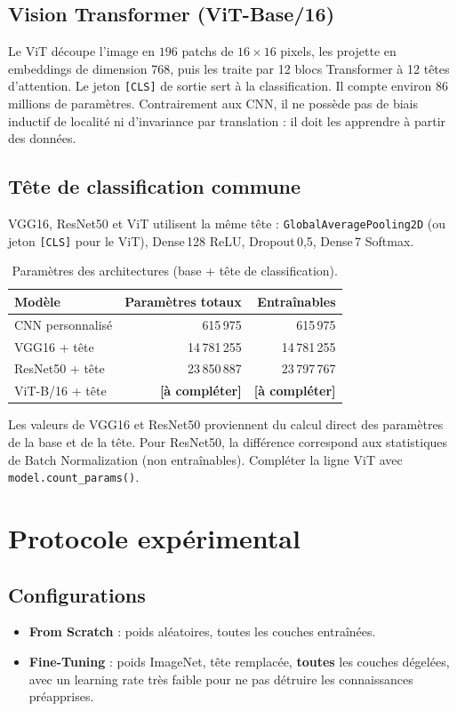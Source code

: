 \documentclass[12pt,a4paper]{article}
\begin{document}
\subsection{Vision Transformer (ViT-Base/16)}
Le ViT découpe l'image en $196$ patchs de $16\times16$ pixels, les projette en embeddings de dimension 768, puis les traite par 12 blocs Transformer à 12 têtes d'attention. Le jeton \texttt{[CLS]} de sortie sert à la classification. Il compte environ 86 millions de paramètres. Contrairement aux CNN, il ne possède pas de biais inductif de localité ni d'invariance par translation : il doit les apprendre à partir des données.

\subsection{Tête de classification commune}
VGG16, ResNet50 et ViT utilisent la même tête : \texttt{GlobalAveragePooling2D} (ou jeton \texttt{[CLS]} pour le ViT), Dense\,128 ReLU, Dropout\,0,5, Dense\,7 Softmax.

\begin{table}[H]
\centering
\caption{Paramètres des architectures (base + tête de classification).}\label{tab:params}
\begin{tabular}{lrr}
\toprule
\textbf{Modèle} & \textbf{Paramètres totaux} & \textbf{Entraînables} \\
\midrule
CNN personnalisé & 615\,975 & 615\,975 \\
VGG16 + tête & 14\,781\,255 & 14\,781\,255 \\
ResNet50 + tête & 23\,850\,887 & 23\,797\,767 \\
ViT-B/16 + tête & \textbf{[à compléter]} & \textbf{[à compléter]} \\
\bottomrule
\end{tabular}
\end{table}
\noindent\small Les valeurs de VGG16 et ResNet50 proviennent du calcul direct des paramètres de la base et de la tête. Pour ResNet50, la différence correspond aux statistiques de Batch Normalization (non entraînables). Compléter la ligne ViT avec \texttt{model.count\_params()}.\normalsize

\section{Protocole expérimental}
\subsection{Configurations}
\begin{itemize}[nosep]
  \item \textbf{From Scratch} : poids aléatoires, toutes les couches entraînées.
  \item \textbf{Fine-Tuning} : poids ImageNet, tête remplacée, \textbf{toutes} les couches dégelées, avec un learning rate très faible pour ne pas détruire les connaissances préapprises.
\end{itemize}
\end{document}
